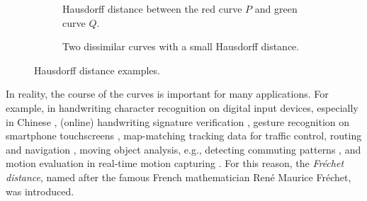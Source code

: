 \documentclass[
oneside,
fontsize=11pt
]{scrartcl}
\begin{document}
\begin{figure}[ht]
  \centering
  \begin{subfigure}[b]{0.45\textwidth}
      \caption{Hausdorff distance between the red curve $P$ and green curve $Q$. }
      \label{fig_hausdorff_distance_example}
  \end{subfigure}
  \hfill
  \begin{subfigure}[b]{0.45\textwidth}
      \caption[Hausdorff distance of two dissimilar curves]{Two dissimilar curves with a small Hausdorff distance.}
      \label{fig_hausdorff_distance_bad_example}
  \end{subfigure}
  \caption[Hausdorff distance examples]{Hausdorff distance examples.}
  \label{fig_hausdorff_distance_examples}
\end{figure}


In reality, the course of the curves is important for many applications. 
For example, 
in handwriting character recognition on digital input devices, especially in Chinese \cite{chanin_david_hanzi_nodate},
(online) handwriting signature verification \cite{zheng_algorithm_2008,fang_research_2018},
gesture recognition on smartphone touchscreens \cite{hu_research_2022}, %
map-matching tracking data for traffic control, routing and navigation \cite{wenk_addressing_2006,brakatsoulas_map-matching_2005},
moving object analysis, e.g., detecting commuting patterns \cite{buchin_detecting_2011},
and motion evaluation in real-time motion capturing \cite{qiao_real-time_2017, shehu_curve_2012}. %
For this reason, the \textit{Fréchet distance}, named after the famous French mathematician René Maurice Fréchet, was introduced.
\end{document}

